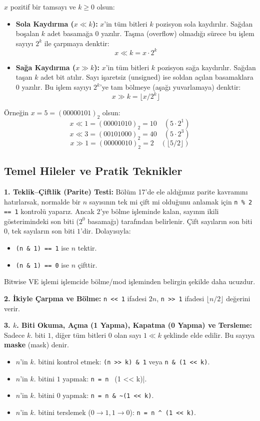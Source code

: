 \begin{definition}
$x$ pozitif bir tamsayı ve $k \ge 0$ olsun:
\begin{itemize}
    \item \textbf{Sola Kaydırma ($x \ll k$):} $x$'in tüm bitleri $k$ pozisyon sola kaydırılır. Sağdan boşalan $k$ adet basamağa $0$ yazılır. Taşma (overflow) olmadığı sürece bu işlem sayıyı $2^k$ ile çarpmaya denktir:
    \[
    x \ll k = x \cdot 2^k
    \]
    \item \textbf{Sağa Kaydırma ($x \gg k$):} $x$'in tüm bitleri $k$ pozisyon sağa kaydırılır. Sağdan taşan $k$ adet bit atılır. Sayı işaretsiz (unsigned) ise soldan açılan basamaklara $0$ yazılır. Bu işlem sayıyı $2^k$'ye tam bölmeye (aşağı yuvarlamaya) denktir:
    \[
    x \gg k = \lfloor x / 2^k \rfloor
    \]
\end{itemize}
\end{definition}

Örneğin $x = 5 = (00000101)_2$ olsun:
\[
x \ll 1 = (00001010)_2 = 10 \quad (5 \cdot 2^1)
\]
\[
x \ll 3 = (00101000)_2 = 40 \quad (5 \cdot 2^3)
\]
\[
x \gg 1 = (00000010)_2 = 2 \quad (\lfloor 5 / 2 \rfloor)
\]

\subsection{Temel Hileler ve Pratik Teknikler}

\textbf{1. Teklik--Çiftlik (Parite) Testi:} 
Bölüm 17'de ele aldığımız parite kavramını hatırlarsak, normalde bir $n$ sayısının tek mi çift mi olduğunu anlamak için \lstinline|n % 2 == 1| kontrolü yaparız. Ancak $2$'ye bölme işleminde kalan, sayının ikili gösterimindeki son biti ($2^0$ basamağı) tarafından belirlenir. Çift sayıların son biti $0$, tek sayıların son biti $1$'dir. Dolayısıyla:
\begin{itemize}
    \item \lstinline|(n & 1) == 1| ise $n$ tektir.
    \item \lstinline|(n & 1) == 0| ise $n$ çifttir.
\end{itemize}
Bitwise VE işlemi işlemcide bölme/mod işleminden belirgin şekilde daha ucuzdur.

\textbf{2. İkiyle Çarpma ve Bölme:}
\lstinline|n << 1| ifadesi $2n$, \lstinline|n >> 1| ifadesi $\lfloor n/2 \rfloor$ değerini verir.

\textbf{3. $k$. Biti Okuma, Açma (1 Yapma), Kapatma (0 Yapma) ve Tersleme:}
Sadece $k$. biti $1$, diğer tüm bitleri $0$ olan sayı $1 \ll k$ şeklinde elde edilir. Bu sayıya \textbf{maske} (mask) denir.
\begin{itemize}
    \item $n$'in $k$. bitini kontrol etmek: \lstinline|(n >> k) & 1| veya \lstinline|n & (1 << k)|.
    \item $n$'in $k$. bitini $1$ yapmak: \lstinline|n = n | (1 << k)|.
    \item $n$'in $k$. bitini $0$ yapmak: \lstinline|n = n & ~(1 << k)|.
    \item $n$'in $k$. bitini terslemek ($0 \to 1, 1 \to 0$): \lstinline|n = n ^ (1 << k)|.
\end{itemize}


